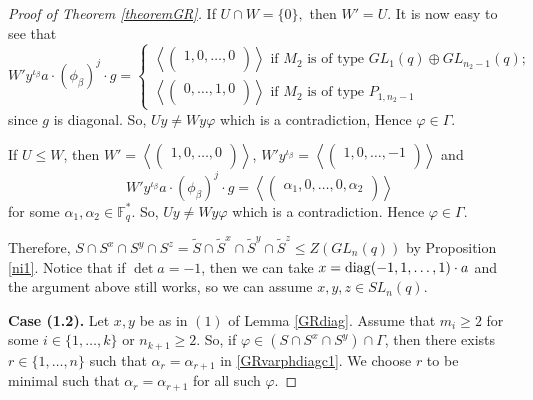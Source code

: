 \begin{proof}[Proof of Theorem {\rm \ref{theoremGR}}]
 If $U \cap W = \{0\},$ then $W'=U.$ It is now easy to see that 
$$W'y^{\iota_{\beta}}a\cdot (\phi_{\beta})^j \cdot g = 
\begin{cases} \left \langle 
\begin{pmatrix}
1,0, \ldots, 0 \\
\end{pmatrix}
\right \rangle \text{ if } M_2 \text{ is of type } GL_1(q) \oplus GL_{n_2-1}(q); \\
\left \langle 
\begin{pmatrix}
0, \ldots,1, 0 \\
\end{pmatrix}
\right \rangle \text{ if } M_2 \text{ is of type } P_{1, n_2-1}
\end{cases} $$
since $g$ is diagonal. So, $Uy \ne Wy \varphi$ which is a contradiction, Hence $\varphi \in \Gamma.$

If $U\le W$, then $W'= \left \langle 
\begin{pmatrix}
1, 0, \ldots, 0 \\
\end{pmatrix}
\right \rangle$, $W'y^{\iota_{\beta}}= \left \langle 
\begin{pmatrix}
1, 0, \ldots, -1 \\
\end{pmatrix}
\right \rangle$ and  $$W'y^{\iota_{\beta}}a\cdot (\phi_{\beta})^j \cdot g=\left \langle 
\begin{pmatrix}
\alpha_1, 0, \ldots,0, \alpha_2 \\
\end{pmatrix}
\right \rangle$$ for some $\alpha_1, \alpha_2 \in \mathbb{F}_q^*.$ So, $Uy \ne Wy \varphi$ which is a contradiction. Hence $\varphi \in \Gamma.$

Therefore, $S\cap S^x \cap S^y \cap S^z = \tilde{S}\cap \tilde{S}^x \cap \tilde{S}^y \cap \tilde{S}^z \le Z(GL_n(q))$ by Proposition \ref{ni1}. Notice that if $\det a=-1$, then we can take $x= \mathrm{diag}(-1, 1, \ldots, 1) \cdot a$ and the argument above still works, so we can assume $x,y,z \in SL_n(q).$

\medskip

{\bf Case (1.2).}  Let $x,y$ be as in $(1)$ of Lemma \ref{GRdiag}. Assume that  $m_i\ge 2$ for some $i \in \{1, \ldots, k\}$ or $n_{k+1}\ge 2.$ So, if $\varphi \in (S \cap S^x \cap S^y) \cap  \Gamma$, then  there exists $r \in \{1, \ldots, n\}$ such that  $\alpha_r =\alpha_{r+1}$ in \eqref{GRvarphdiagc1}. We choose $r$ to be minimal such that $\alpha_r =\alpha_{r+1}$ for all such $\varphi.$


\end{proof}
